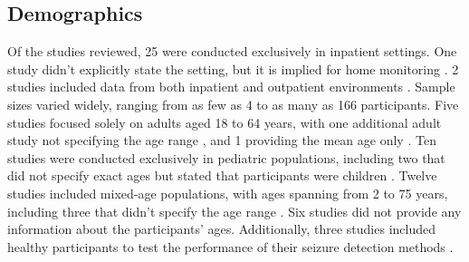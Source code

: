 \subsection{Demographics}

Of the studies reviewed, 25 were conducted exclusively in inpatient settings. One study didn’t explicitly state the setting, but it is implied for home monitoring \cite{Hassan2022-do}. 2 studies included data from both inpatient and outpatient environments \cite{Regalia2019-ch, Nasseri2021-xn}. Sample sizes varied widely, ranging from as few as 4 \cite{Li2022-ty} to as many as 166 \cite{Yu2023-ss} participants. Five studies focused solely on adults aged 18 \cite{Gharbi2024-ad} to 64 \cite{Cogan2017-lg} years, with one additional adult study not specifying the age range \cite{Bottcher2021-zl}, and 1 providing the mean age only \cite{Hamlin2021-sd}. Ten studies were conducted exclusively in pediatric populations, including two that did not specify exact ages but stated that participants were children \cite{Milosevic2016-ee, De_Cooman2018-pq}. Twelve studies included mixed-age populations, with ages spanning from 2 \cite{Van_Andel2017-yx} to 75 \cite{Larsen2024-vn} years, including three that didn’t specify the age range \cite{Nasseri2021-xn, Regalia2019-ch, Xu2022-tx}. Six studies did not provide any information about the participants' ages. Additionally, three studies included healthy participants to test the performance of their seizure detection methods \cite{Wang2022-lt, Larsen2024-vn, Wang2025-my}.